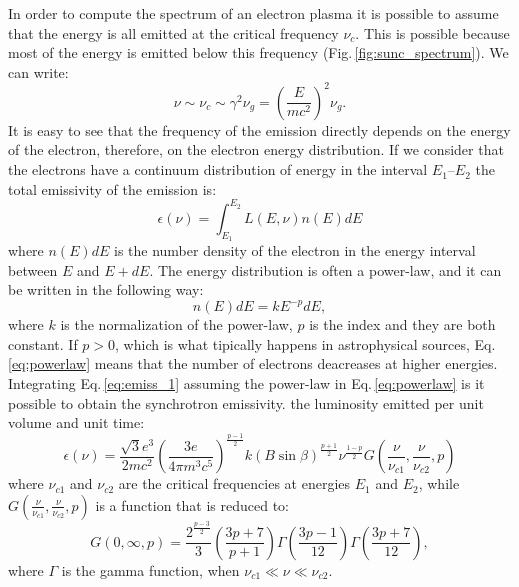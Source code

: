 \documentclass[../main.tex]{subfiles}
\begin{document}
In order to compute the spectrum of an electron plasma it is possible to assume that the energy is all emitted at the critical frequency $\nu_c$. 
This is possible because most of the energy is emitted below this frequency (Fig.\,\ref{fig:sunc_spectrum}).
We can write:
\begin{equation}
    \label{eq: new_crit_freq}
    \nu \sim \nu_c\sim \gamma^2 \nu_g = \left(\frac{E}{mc^2}\right)^2\nu_g.
\end{equation}
It is easy to see that the frequency of the emission directly depends on the energy of the electron, therefore, on the electron energy distribution.
If we consider that the electrons have a continuum distribution of energy in the interval $E_1$--$E_2$ the total emissivity of the emission is:
\begin{equation}
    \label{eq:emiss_1}
    \epsilon(\nu) = \int_{E_1}^{E_2} L(E,\nu) n(E)dE
\end{equation}
where $n(E)dE$ is the number density of the electron in the energy interval between $E$ and $E+dE$.
The energy distribution is often a power-law, and it can be written in the following way:
\begin{equation}
    \label{eq:powerlaw}
    n(E)dE=kE^{-p}dE,
\end{equation}
where $k$ is the normalization of the power-law, $p$ is the index and they are both constant.
If $p>0$, which is what tipically happens in astrophysical sources, Eq.\,\ref{eq:powerlaw} means that the number of electrons deacreases at higher energies.
Integrating Eq.\,\ref{eq:emiss_1} assuming the power-law in Eq.\,\ref{eq:powerlaw} is it possible to obtain the synchrotron emissivity. the luminosity emitted per unit volume and unit time:
\begin{equation}
    \label{eq:emiss_2}
    \epsilon(\nu)=\frac{\sqrt{3}e^3}{2mc^2}\left(\frac{3e}{4\pi m^3 c^5}\right)^{\frac{p-1}{2}}k\left(B\sin\beta\right)^{\frac{p+1}{2}}\nu^{\frac{1-p}{2}}G\left(\frac{\nu}{\nu_{c1}},\frac{\nu}{\nu_{c2}},p\right)
\end{equation}
where $\nu_{c1}$ and $\nu_{c2}$ are the critical frequencies at energies $E_1$ and $E_2$, while $G\left(\frac{\nu}{\nu_{c1}},\frac{\nu}{\nu_{c2}},p\right)$ is a function that is reduced to:
\begin{equation}
    \label{eq:G}
    G\left(0,\infty,p\right) = \frac{2^{\frac{p-3}{2}}}{3}\left(\frac{3p+7}{p+1}\right)\Gamma\left(\frac{3p-1}{12}\right)\Gamma\left(\frac{3p+7}{12}\right),
\end{equation}
where $\Gamma$ is the gamma function, when $\nu_{c1}\ll\nu\ll\nu_{c2}$.
\end{document}
